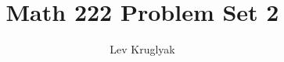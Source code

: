 \documentclass{lkx_pset}
\title{Math 222 Problem Set 2}
\author{Lev Kruglyak}
\begin{document}
\maketitle

\begin{problem}{6}
\end{problem}
\end{document}
